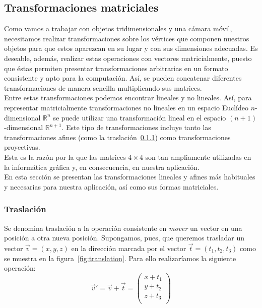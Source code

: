 \subsection{Transformaciones matriciales}
\label{makereference5.4.1}

Como vamos a trabajar con objetos tridimensionales y una cámara móvil,
necesitamos realizar transformaciones sobre los vértices que componen nuestros
objetos para que estos aparezcan en su lugar y con sus dimensiones adecuadas.
Es deseable, además, realizar estas operaciones con vectores matricialmente,
puesto que éstas permiten presentar transformaciones arbitrarias en un
formato consistente y apto para la computación. Así, se pueden concatenar
diferentes transformaciones de manera sencilla multiplicando sus matrices. \\

Entre estas transformaciones podemos encontrar lineales y no lineales. Así, para
representar matricialmente transformaciones no lineales en un espacio Euclídeo
$n$-dimensional $\mathbb{R}^n$ se puede utilizar una transformación lineal en el
espacio $(n+1)$-dimensional $\mathbb{R}^{n+1}$. Este tipo de transformaciones
incluye tanto las transformaciones afines (como la
traslación~\ref{makereference5.4.1.1}) como transformaciones proyectivas.\\

Esta es la razón por la que las matrices $4 \times 4$ son tan ampliamente
utilizadas en la informática gráfica y, en consecuencia, en nuestra
aplicación.\\

En esta sección se presentan las transformaciones lineales y afines más
habituales y necesarias para nuestra aplicación, así como sus formas
matriciales. \\

\subsubsection{Traslación}
\label{makereference5.4.1.1}

Se denomina traslación a la operación consistente en \textit{mover} un vector en
una posición a otra nueva posición. Supongamos, pues, que queremos trasladar un
vector $\overrightarrow{v} = (x,y,z)$ en la dirección marcada por el vector
$\overrightarrow{t} = (t_1, t_2, t_3)$ como se muestra en la
figura~\ref{fig:translation}. Para ello realizaríamos la siguiente operación:\\

\begin{equation}
	\label{eq:translation}
	\overrightarrow{v}' = \overrightarrow{v} + \overrightarrow{t} = 
	\left( \begin{array}{c}
			x + t_1 \\
			y + t_2 \\
			z + t_3 \\
	\end{array} \right)
\end{equation}\\

